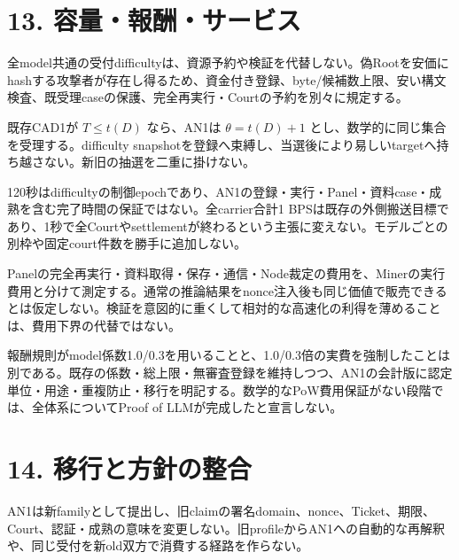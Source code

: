 \documentclass[
  10pt,
]{article}
\begin{document}
\section{13.
容量・報酬・サービス}\label{ux5bb9ux91cfux5831ux916cux30b5ux30fcux30d3ux30b9}

全model共通の受付difficultyは、資源予約や検証を代替しない。偽Rootを安価にhashする攻撃者が存在し得るため、資金付き登録、byte/候補数上限、安い構文検査、既受理caseの保護、完全再実行・Courtの予約を別々に規定する。

既存CAD1が \(T\le t(D)\) なら、AN1は \(\theta=t(D)+1\)
とし、数学的に同じ集合を受理する。difficulty
snapshotを登録へ束縛し、当選後により易しいtargetへ持ち越さない。新旧の抽選を二重に掛けない。

120秒はdifficultyの制御epochであり、AN1の登録・実行・Panel・資料case・成熟を含む完了時間の保証ではない。全carrier合計1
BPSは既存の外側搬送目標であり、1秒で全Courtやsettlementが終わるという主張に変えない。モデルごとの別枠や固定court件数を勝手に追加しない。

Panelの完全再実行・資料取得・保存・通信・Node裁定の費用を、Minerの実行費用と分けて測定する。通常の推論結果をnonce注入後も同じ価値で販売できるとは仮定しない。検証を意図的に重くして相対的な高速化の利得を薄めることは、費用下界の代替ではない。

報酬規則がmodel係数1.0/0.3を用いることと、1.0/0.3倍の実費を強制したことは別である。既存の係数・総上限・無審査登録を維持しつつ、AN1の会計版に認定単位・用途・重複防止・移行を明記する。数学的なPoW費用保証がない段階では、全体系についてProof
of LLMが完成したと宣言しない。

\section{14.
移行と方針の整合}\label{ux79fbux884cux3068ux65b9ux91ddux306eux6574ux5408}

AN1は新familyとして提出し、旧claimの署名domain、nonce、Ticket、期限、Court、認証・成熟の意味を変更しない。旧profileからAN1への自動的な再解釈や、同じ受付を新old双方で消費する経路を作らない。
\end{document}
